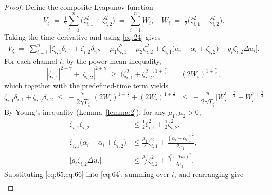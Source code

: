 \documentclass[pdflatex,sn-mathphys-num]{sn-jnl}%
\theoremstyle{thmstyleone}%
\theoremstyle{thmstyletwo}%
\theoremstyle{thmstylethree}%
\begin{document}
	\begin{proof}
	Define the composite Lyapunov function
	\begin{equation}\label{eq:63}
	  V_{\zeta} \;=\; \tfrac12\sum_{i=1}^{n}\big(\zeta_{i,1}^{2}+\zeta_{i,2}^{2}\big)
	  \;=\; \sum_{i=1}^{n} W_i, \quad
	  W_i \;=\; \tfrac12\big(\zeta_{i,1}^{2}+\zeta_{i,2}^{2}\big).
	\end{equation}
	Taking the time derivative and using \cref{eq:24} gives
	\begin{equation}\label{eq:64}
	\begin{aligned}
	  \dot V_{\zeta}
	  \;=\; \sum_{i=1}^{n}\!\Big[
		\zeta_{i,1}\delta_{i,1}+\zeta_{i,2}\delta_{i,2}
		-\mu_{1}\zeta_{i,1}^{2}-\mu_{2}\zeta_{i,2}^{2}
		+\zeta_{i,1}\big(\tilde\alpha_i-\alpha_i+\zeta_{i,2}\big)
		-g_i\zeta_{i,2}\Delta u_i
	  \Big].
	\end{aligned}
	\end{equation}
	For each channel $i$, by the power-mean inequality,
	\[
	  |\zeta_{i,1}|^{2\pm\gamma}+|\zeta_{i,2}|^{2\pm\gamma}
	  \;\ge\;
	  \big(\zeta_{i,1}^{2}+\zeta_{i,2}^{2}\big)^{1\pm\frac{\gamma}{2}}
	  \;=\; (2W_i)^{1\pm\frac{\gamma}{2}},
	\]
	which together with the predefined-time term yields
	\begin{equation}\label{eq:65}
	  \zeta_{i,1}\delta_{i,1}+\zeta_{i,2}\delta_{i,2}
	  \;\le\;
	  -\frac{\pi}{2\gamma T_{\zeta}}
	  \Big[(2W_i)^{1-\frac{\gamma}{2}}+(2W_i)^{1+\frac{\gamma}{2}}\Big]
	  \;\le\;
	  -\frac{\pi}{2\gamma T_{\zeta}}
	  \Big[W_i^{1-\frac{\gamma}{2}}+W_i^{1+\frac{\gamma}{2}}\Big].
	\end{equation}
	By Young’s inequality (Lemma~\ref{lemma:2}), for any $\mu_{1},\mu_{2}>0$,
	\begin{subequations}\label{eq:66}
	\begin{align}
		\zeta_{i,1}\zeta_{i,2}
	  &\le \tfrac12\zeta_{i,1}^{2}+\tfrac12\zeta_{i,2}^{2},\\
	  \zeta_{i,1}\big(\tilde\alpha_i-\alpha_i+\zeta_{i,2}\big)
	 &\le \tfrac{\mu_{1}}{2}\zeta_{i,1}^{2}
		 +\tfrac{(\tilde\alpha_i-\alpha_i)^{2}}{2\mu_{1}},\\
		 \big| g_i\zeta_{i,2}\Delta u_i \big|
	  &\le \tfrac{\mu_{2}}{2}\zeta_{i,2}^{2}
		 +\tfrac{g_i^{2}(\Delta u_i)^{2}}{2\mu_{2}}.
	\end{align}
	\end{subequations}
	Substituting \cref{eq:65,eq:66} into \cref{eq:64}, summing over $i$, and rearranging give
	\begin{equation}\label{eq:67}
	\begin{aligned}

\end{aligned}
\end{equation}
\end{proof}
\end{document}
